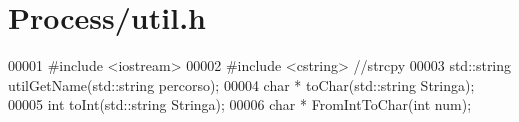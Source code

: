 \hypertarget{util_8h_source}{\section{\-Process/util.h}
}

\begin{DoxyCode}
00001 \textcolor{preprocessor}{#include <iostream>}
00002 \textcolor{preprocessor}{#include <cstring>} \textcolor{comment}{//strcpy}
00003 std::string utilGetName(std::string percorso);
00004 \textcolor{keywordtype}{char} * toChar(std::string Stringa);
00005 \textcolor{keywordtype}{int} toInt(std::string Stringa);
00006 \textcolor{keywordtype}{char} * FromIntToChar(\textcolor{keywordtype}{int} num);
\end{DoxyCode}
